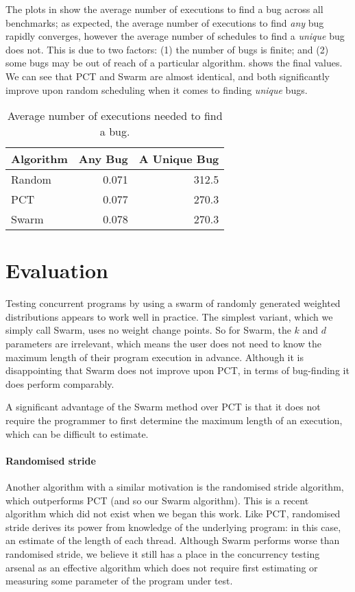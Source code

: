 The plots in  show the average number of executions
to find a bug across all benchmarks; as expected, the average number
of executions to find \emph{any} bug rapidly converges, however the
average number of schedules to find a \emph{unique} bug does not.
This is due to two factors: (1) the number of bugs is finite; and (2)
some bugs may be out of reach of a particular algorithm.
 shows the final values.  We can see that PCT and
Swarm are almost identical, and both significantly improve upon random
scheduling when it comes to finding \emph{unique} bugs.

\begin{table}
  \centering
  \begin{tabular}{lrr} \toprule
    Algorithm & Any Bug & A Unique Bug \\ \midrule
    Random & 0.071 & 312.5 \\
    PCT   & 0.077 & 270.3 \\
    Swarm & 0.078 & 270.3 \\ \bottomrule
  \end{tabular}
  \caption{Average number of executions needed to find a bug.}\label{tbl:freqs}
\end{table}

\section{Evaluation}
\label{sec:algorithms-eval}

Testing concurrent programs by using a swarm of randomly generated
weighted distributions appears to work well in practice.  The simplest
variant, which we simply call Swarm, uses no weight change points.  So
for Swarm, the $k$ and $d$ parameters are irrelevant, which means the
user does not need to know the maximum length of their program
execution in advance.  Although it is disappointing that Swarm does
not improve upon PCT, in terms of bug-finding it does perform
comparably.

A significant advantage of the Swarm method over PCT is that it does
not require the programmer to first determine the maximum length of an
execution, which can be difficult to estimate.

\paragraph{Randomised stride}
Another algorithm with a similar motivation is the randomised stride
algorithm\cite{abdelrasoul2017}, which outperforms PCT (and so our
Swarm algorithm).  This is a recent algorithm which did not exist when
we began this work.  Like PCT, randomised stride derives its power
from knowledge of the underlying program: in this case, an estimate of
the length of each thread.  Although Swarm performs worse than
randomised stride, we believe it still has a place in the concurrency
testing arsenal as an effective algorithm which does not require first
estimating or measuring some parameter of the program under test.

